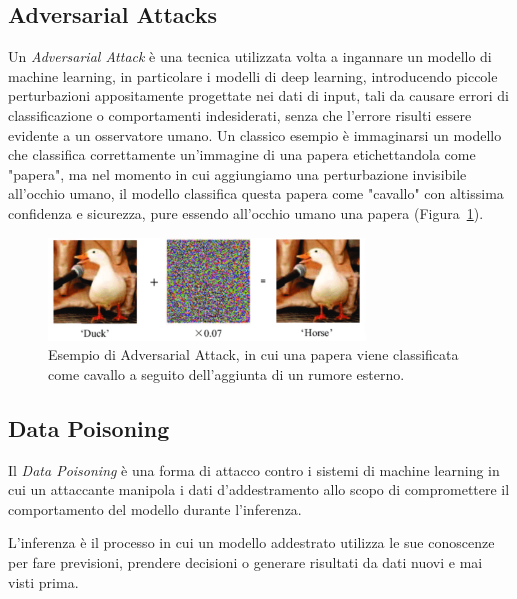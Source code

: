 \subsection{Adversarial Attacks}

Un \textit{Adversarial Attack} è una tecnica utilizzata volta a ingannare un modello di machine learning, in particolare i modelli di deep learning, introducendo piccole perturbazioni appositamente progettate nei dati di input, tali da causare errori di classificazione o comportamenti indesiderati, senza che l’errore risulti essere evidente a un osservatore umano. Un classico esempio è immaginarsi un modello che classifica correttamente un’immagine di una papera etichettandola come "papera", ma nel momento in cui aggiungiamo una perturbazione invisibile all’occhio umano, il modello classifica questa papera come "cavallo" con altissima confidenza e sicurezza, pure essendo all'occhio umano una papera (Figura~\ref{fig:adattack}).

\begin{figure}
    \centering
    \includegraphics[width=0.75\textwidth]{figure/AdversarialAttack.png}
    \caption{Esempio di Adversarial Attack, in cui una papera viene classificata come cavallo a seguito dell'aggiunta di un rumore esterno.}
    \label{fig:adattack}
\end{figure}

\subsection{Data Poisoning}
Il \textit{Data Poisoning} è una forma di attacco contro i sistemi di machine learning in cui un attaccante manipola i dati d'addestramento allo scopo di compromettere il comportamento del modello durante l’inferenza.

\begin{Definizione}
    L'inferenza è il processo in cui un modello addestrato utilizza le sue conoscenze per fare previsioni, prendere decisioni o generare risultati da dati nuovi e mai visti prima.
\end{Definizione}

